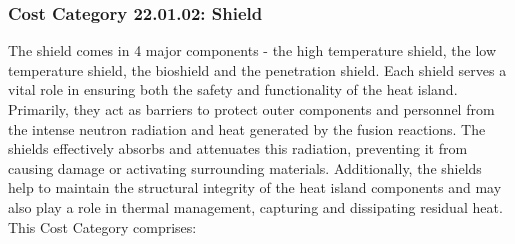 \subsubsection*{Cost Category 22.01.02: Shield} 

The shield comes in 4 major components - the high temperature shield, the low temperature shield, the bioshield and the penetration shield. Each shield serves a vital role in ensuring both the safety and functionality of the heat island. Primarily, they act as barriers to protect outer components and personnel from the intense neutron radiation and heat generated by the fusion reactions. The shields effectively absorbs and attenuates this radiation, preventing it from causing damage or activating surrounding materials. Additionally, the shields help to maintain the structural integrity of the heat island components and may also play a role in thermal management, capturing and dissipating residual heat. \\

This Cost Category comprises: 

